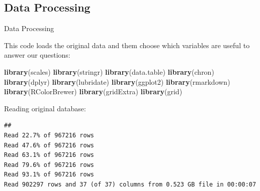 \documentclass[]{article}
\newenvironment{Shaded}{\begin{snugshade}}{\end{snugshade}}
\newcommand{\KeywordTok}[1]{\textcolor[rgb]{0.13,0.29,0.53}{\textbf{{#1}}}}
\newcommand{\DataTypeTok}[1]{\textcolor[rgb]{0.13,0.29,0.53}{{#1}}}
\newcommand{\CharTok}[1]{\textcolor[rgb]{0.31,0.60,0.02}{{#1}}}
\newcommand{\StringTok}[1]{\textcolor[rgb]{0.31,0.60,0.02}{{#1}}}
\newcommand{\CommentTok}[1]{\textcolor[rgb]{0.56,0.35,0.01}{\textit{{#1}}}}
\newcommand{\NormalTok}[1]{{#1}}
\begin{document}
\subsection{Data Processing}\label{data-processing}

Data Processing

This code loads the original data and them choose which variables are
useful to answer our questions:

\begin{Shaded}
\begin{Highlighting}[]
\KeywordTok{library}\NormalTok{(scales)}
\KeywordTok{library}\NormalTok{(stringr)}
\KeywordTok{library}\NormalTok{(data.table)}
\KeywordTok{library}\NormalTok{(chron)}
\KeywordTok{library}\NormalTok{(dplyr)}
\KeywordTok{library}\NormalTok{(lubridate)}
\KeywordTok{library}\NormalTok{(ggplot2)}
\KeywordTok{library}\NormalTok{(rmarkdown)}
\KeywordTok{library}\NormalTok{(RColorBrewer)}
\KeywordTok{library}\NormalTok{(gridExtra)}
\KeywordTok{library}\NormalTok{(grid)}
\end{Highlighting}
\end{Shaded}

Reading original database:

\begin{Shaded}
\end{Shaded}

\begin{verbatim}
## 
Read 22.7% of 967216 rows
Read 47.6% of 967216 rows
Read 63.1% of 967216 rows
Read 79.6% of 967216 rows
Read 93.1% of 967216 rows
Read 902297 rows and 37 (of 37) columns from 0.523 GB file in 00:00:07
\end{verbatim}
\end{document}

